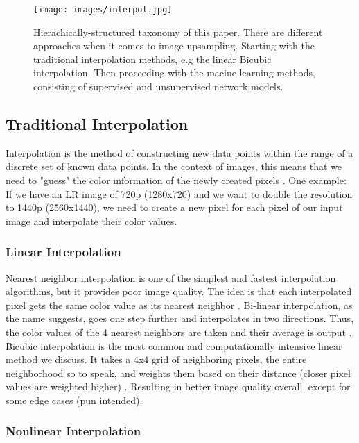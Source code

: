 \documentclass[letterpaper, 10 pt, conference]{ieeeconf}  %
\begin{document}
\begin{figure}[!ht]
        \caption{Hierachically-structured taxonomy of this paper.
        There are different approaches when it comes to image upsampling. 
        Starting with the traditional interpolation methods, e.g the linear Bicubic interpolation. 
        Then proceeding with the macine learning methods, consisting of supervised and unsupervised network models.}
        \centering
        \texttt{[image: images/interpol.jpg]}
        \label{fig:upsampling_methods}
    \end{figure}

\subsection{Traditional Interpolation}
\label{subsec:traditional}
Interpolation is the method of constructing new data points within the range of a discrete set of known data points.
In the context of images, this means that we need to "guess" the color information of the newly created pixels \cite{image_interpolation_def}.
One example: If we have an LR image of 720p (1280x720) and we want to double the resolution to 1440p (2560x1440), 
we need to create a new pixel for each pixel of our input image and interpolate their color values.

\subsubsection{Linear Interpolation}

Nearest neighbor interpolation is one of the simplest and fastest interpolation algorithms, but it provides poor image quality. 
The idea is that each interpolated pixel gets the same color value as its nearest neighbor \cite{nearest_n}.
Bi-linear interpolation, as the name suggests, goes one step further and interpolates in two directions. 
Thus, the color values of the 4 nearest neighbors are taken and their average is output \cite{bilinear}.
Bicubic interpolation is the most common and computationally intensive linear method we discuss. 
It takes a 4x4 grid of neighboring pixels, the entire neighborhood so to speak, and weights them based on their distance (closer pixel values are weighted higher) \cite{bicubic}. 
Resulting in better image quality overall, except for some edge cases (pun intended).

\subsubsection{Nonlinear Interpolation}
\end{document}
